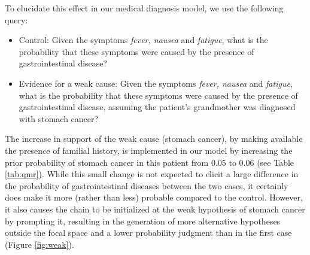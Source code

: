 To elucidate this effect in our medical diagnosis model, we use the following query:
\begin{itemize}
\item Control: Given the symptoms \emph{fever, nausea}  and \emph{fatigue}, what is the probability that these symptoms were caused by the presence of gastrointestinal disease?
\item Evidence for a weak cause: Given the symptoms \emph{fever, nausea}  and \emph{fatigue}, what is the probability that these symptoms were caused by the presence of gastrointestinal disease, assuming the patient's grandmother was diagnosed with stomach cancer?
\end{itemize}
The increase in support of the weak cause (stomach cancer), by making available the presence of familial history, is implemented in our model by increasing the prior probability of stomach cancer in this patient from 0.05 to 0.06 (see Table \ref{tab:qmr}). While this small change is not expected to elicit a large difference in the probability of gastrointestinal diseases between the two cases, it certainly does make it more (rather than less) probable compared to the control. However, it also causes the chain to be initialized at the weak hypothesis of stomach cancer by prompting it, resulting in the generation of more alternative hypotheses outside the focal space and a lower probability judgment than in the first case (Figure \ref{fig:weak}).

